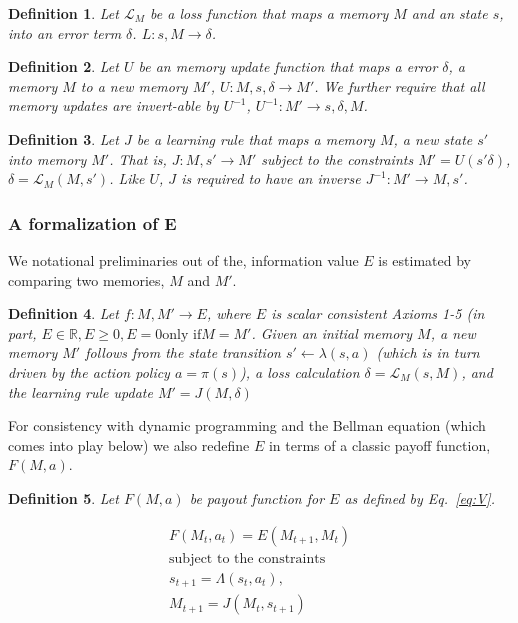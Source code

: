 \documentclass[9pt,twocolumn,twoside]{pnas-new}
\newtheorem{definition}{Definition}
\begin{document}
\begin{definition}
    Let $\mathcal{L}_M$ be a loss function that maps a memory $M$ and an state $s$, into an error term $\delta$. $L : s, M \rightarrow \delta$.
\end{definition}

\begin{definition}
    Let $U$ be an memory update function that maps a error $\delta$, a memory $M$ to a new memory $M'$, $U : M, s, \delta \rightarrow M'$. We further require that all memory updates are invert-able by $U^{-1}$, $U^{-1} : M' \rightarrow s, \delta, M$.
\end{definition}

\begin{definition}
    Let $J$ be a learning rule that maps a memory $M$, a new state $s'$ into memory $M'$. That is, $J : M, s' \rightarrow M'$ subject to the constraints  $M' = U(s' \delta)$, $\delta = \mathcal{L}_M(M, s')$. Like $U$, $J$ is required to have an inverse $J^{-1} : M' \rightarrow M, s'$.
\end{definition}

\subsubsection*{A formalization of E}
We notational preliminaries out of the, information value $E$ is estimated by comparing two memories, $M$ and $M'$.

\begin{definition}
      Let $f : M, M' \rightarrow E$, where $E$ is scalar consistent Axioms 1-5 (in part, $E \in \mathbb{R}, E \ge 0, E = 0 \text{only if} M = M'$. Given an initial memory $M$, a new memory $M'$ follows from the state transition $s' \leftarrow \lambda (s, a)$ (which is in turn driven by the action policy $a = \pi(s)$), a loss calculation $\delta = \mathcal{L}_M(s, M)$, and the learning rule update $M' = J(M, \delta)$
\end{definition}

For consistency with dynamic programming and the Bellman equation (which comes into play below) we also redefine $E$ in terms of a classic payoff function, $F(M, a)$.

\begin{definition}
    Let $F(M, a)$ be payout function for $E$ as defined by Eq.~\ref{eq:V}.
\end{definition}

\begin{equation}
    \begin{split} \label{eq:V}
    F(M_t, a_t) = E(M_{t+1}, M_{t})\\
    \text{subject to the constraints} \\
    s_{t+1} = \Lambda(s_t, a_t),\\ 
    M_{t+1} = J(M_t, s_{t+1})
    \end{split} 
\end{equation}
\end{document}
